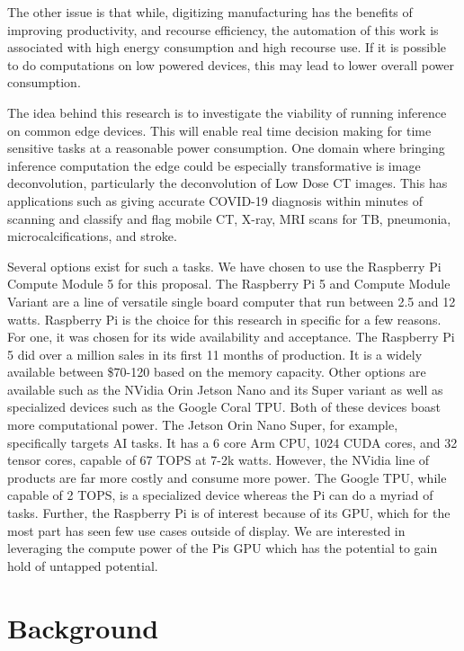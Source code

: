 \documentclass[conference]{IEEEtran}
\begin{document}
 The other issue is that while, digitizing manufacturing has the benefits of 
 improving productivity, and recourse efficiency, the automation of this work is 
 associated with high energy consumption and high recourse use. If it is 
 possible to do computations on low powered devices, this may lead to lower 
 overall power consumption\cite{ghobakhloo_industry_2020}. 

 The idea behind this research is to investigate the viability of running inference 
 on common edge devices. This will enable real time decision making for time sensitive 
 tasks at a reasonable power consumption. 
 One domain where bringing inference computation the edge could be especially transformative is image 
deconvolution, particularly the deconvolution of Low Dose CT images. This has applications such as 
giving accurate COVID-19 diagnosis within minutes of scanning\cite{goel_computecovid19_2021} and classify 
and flag mobile CT, X-ray, MRI scans for TB, pneumonia, microcalcifications, and stroke\cite{edge_device_machine_learning_poc}.
 
 Several options exist for such a tasks. We have chosen to use the Raspberry Pi Compute Module 5 for 
 this proposal. The Raspberry Pi 5 and Compute Module Variant are a line of versatile single board computer 
 that run between 2.5 and 12 watts. 
 Raspberry Pi is the choice for this research in specific for a few reasons. For one, 
 it was chosen for its wide availability and acceptance. The Raspberry Pi 5 did over a million 
 sales in its first 11 months of production\cite{king_revenue_2024}. It is a widely available between \$70-120 based on 
 the memory capacity. Other options are available such as the NVidia Orin Jetson Nano and 
 its Super variant as well as specialized devices such as the Google Coral TPU. Both of these devices 
 boast more computational power. The Jetson Orin Nano Super, for example, specifically targets AI tasks.
 It has a 6 core Arm CPU, 1024 CUDA cores, and 32 tensor cores, capable of 67 TOPS at 
 7-2k watts\cite{jetson_orin_nano}. However, the NVidia line of products are far more 
 costly and consume more power. The Google TPU, while capable of 2 TOPS, is a specialized device whereas the Pi can 
 do a myriad of tasks. Further, the Raspberry Pi is of interest because of its GPU, which 
 for the most part has seen few use cases outside of display. We are interested in leveraging 
 the compute power of the Pis GPU which has the potential to gain hold of untapped potential.
 
 \section{Background}
\end{document}
